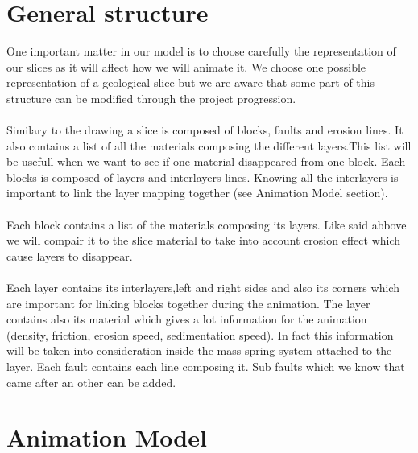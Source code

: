 \documentclass[12pt, a4paper]{memoir} %
\begin{document}
\section{General structure}

One important matter in our model is to choose carefully the representation of our slices as it will affect how we will animate it.
We choose one possible representation of a geological slice but we are aware that some part of this structure can be modified through the project progression.\\\\
Similary to the drawing a slice is composed of blocks, faults and erosion lines. It also contains a list of all the materials composing the different layers.This list will be usefull when we want to see if one material disappeared from one block. Each blocks is composed of layers and interlayers lines. Knowing all the interlayers is important to link the layer mapping together (see Animation Model section).\\\\
Each block contains a list of the materials composing its layers. Like said abbove we will compair it to the slice material to take into account erosion effect which cause layers to disappear. \\\\
Each layer contains its interlayers,left and right sides and also its corners which are important for linking blocks together during the animation. The layer contains also its material which gives a lot information for the animation (density, friction, erosion speed, sedimentation speed). 
In fact this information will be taken into consideration inside the mass spring system attached to the layer.
Each fault contains each line composing it. Sub faults which we know that came after an other can be added.


\section{Animation Model}
\end{document}
